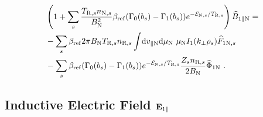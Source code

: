 \begin{gather}
    \begin{aligned}
        &\left(1 + \sum_s \frac{T_{\mathrm{R},s}n_{\mathrm{N},s}}{B_\mathrm{N}^2} \beta_\mathrm{ref} (\Gamma_0(b_s) - \Gamma_1(b_s)) e^{-\mathcal{E}_{\mathrm{N},s}/T_{\mathrm{R},s}}\right) \widehat{B}_{1\parallel \mathrm{N}} = \\
        &-\sum_s \beta_\mathrm{ref} 2\pi B_\mathrm{N} T_{\mathrm{R},s} n_{\mathrm{R},s} \int \! \mathrm{d}v_{\parallel \mathrm{N}} \mathrm{d}\mu_\mathrm{N} ~ \mu_\mathrm{N} I_1(k_\perp \rho_s) \widehat{F}_{1\mathrm{N},s} \\
        &-\sum_s \beta_\mathrm{ref} (\Gamma_0(b_s) - \Gamma_1(b_s)) e^{-\mathcal{E}_{\mathrm{N},s}/T_{\mathrm{R},s}} \frac{Z_sn_{\mathrm{R},s}}{2 B_\mathrm{N}} \widehat{\Phi}_{1 \mathrm{N}} ~.
    \end{aligned}
\end{gather}

\subsection*{Inductive Electric Field $\boldsymbol{\mathbf{E}}_{1 \parallel}$}
\label{sub:fieldEparLocal}

